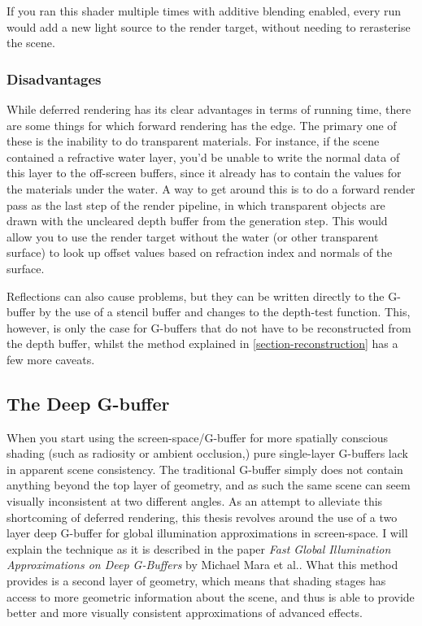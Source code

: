 If you ran this shader multiple times with additive blending enabled, every run would add a new light source to the render target, without needing to rerasterise the scene.

\subsubsection{Disadvantages}
While deferred rendering has its clear advantages in terms of running time, there are some things for which forward rendering has the edge. The primary one of these is the inability to do transparent materials. For instance, if the scene contained a refractive water layer, you'd be unable to write the normal data of this layer to the off-screen buffers, since it already has to contain the values for the materials under the water. A way to get around this is to do a forward render pass as the last step of the render pipeline, in which transparent objects are drawn with the uncleared depth buffer from the generation step. This would allow you to use the render target without the water (or other transparent surface) to look up offset values based on refraction index and normals of the surface.

Reflections can also cause problems, but they can be written directly to the G-buffer by the use of a stencil buffer and changes to the depth-test function. This, however, is only the case for G-buffers that do not have to be reconstructed from the depth buffer, whilst the method explained in \ref{section-reconstruction} has a few more caveats.

\subsection{The Deep G-buffer}
\label{section-deepbuffer}
When you start using the screen-space/G-buffer for more spatially conscious shading (such as radiosity or ambient occlusion,) pure single-layer G-buffers lack in apparent scene consistency. The traditional G-buffer simply does not contain anything beyond the top layer of geometry, and as such the same scene can seem visually inconsistent at two different angles. As an attempt to alleviate this shortcoming of deferred rendering, this thesis revolves around the use of a two layer deep G-buffer for global illumination approximations in screen-space. I will explain the technique as it is described in the paper \emph{Fast Global Illumination Approximations on Deep G-Buffers} by Michael Mara et al.\cite{deep-g-buffer}. What this method provides is a second layer of geometry, which means that shading stages has access to more geometric information about the scene, and thus is able to provide better and more visually consistent approximations of advanced effects.

